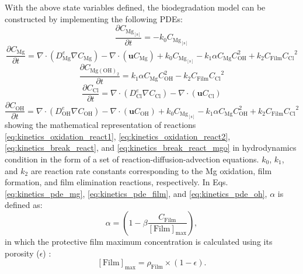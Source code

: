 With the above state variables defined, the biodegradation model can be constructed by implementing the following {PDE}s:
\begin{equation} \label{eq:kinetics_pde_mg_solid}
\frac{\partial C_{\mathrm{Mg}_\mathrm{[s]}}}{\partial t}=-k_{0}C_{\mathrm{Mg}_\mathrm{[s]}}
\end{equation}
\begin{equation} \label{eq:kinetics_pde_mg}
\frac{\partial C_{\mathrm{Mg}}}{\partial t}=\nabla \cdot \left(D_{\mathrm{Mg}}^{e}  \nabla C_{\mathrm{Mg}} \right)-\nabla \cdot \left({\mathbf u} C_{\mathrm{Mg}} \right)+k_{0}C_{\mathrm{Mg}_\mathrm{[s]}}-k_{1}\alpha C_{\mathrm{Mg}}C_{\mathrm{OH}}^2 +k_{2} C_{\mathrm{Film}} {C_{\mathrm{Cl}}}^{2}
\end{equation}
\begin{equation} \label{eq:kinetics_pde_film}
\frac{\partial C_{\mathrm{Mg}(\mathrm{OH})_{2}}}{\partial t}=k_{1}\alpha C_{\mathrm{Mg}}C_{\mathrm{OH}}^2 -k_{2} C_{\mathrm{Film}} {C_{\mathrm{Cl}}}^{2}
\end{equation}
\begin{equation} \label{eq:kinetics_pde_cl}
\frac{\partial C_{\mathrm{Cl}}}{\partial t}=\nabla \cdot \left(D_{\mathrm{Cl}}^{e}  \nabla C_{\mathrm{Cl}} \right)-\nabla \cdot \left({\mathbf u} C_{\mathrm{Cl}} \right)
\end{equation}
\begin{equation} \label{eq:kinetics_pde_oh}
\frac{\partial C_{\mathrm{OH}}}{\partial t}=\nabla \cdot \left(D_{\mathrm{OH}}^{e}  \nabla C_{\mathrm{OH}} \right)-\nabla \cdot \left({\mathbf u} C_{\mathrm{OH}} \right)+k_{0}C_{\mathrm{Mg}_\mathrm{[s]}}-k_{1}\alpha C_{\mathrm{Mg}}C_{\mathrm{OH}}^2 +k_{2} C_{\mathrm{Film}} {C_{\mathrm{Cl}}}^{2}
\end{equation}
showing the mathematical representation of reactions \ref{eq:kinetics_oxidation_react1}, \ref{eq:kinetics_oxidation_react2}, \ref{eq:kinetics_break_react}, and \ref{eq:kinetics_break_react_mgo} in hydrodynamics condition in the form of a set of reaction-diffusion-advection equations. $k_0$, $k_1$, and $k_2$ are reaction rate constants corresponding to the Mg oxidation, film formation, and film elimination reactions, respectively. In Eqs. \ref{eq:kinetics_pde_mg}, \ref{eq:kinetics_pde_film}, and \ref{eq:kinetics_pde_oh}, $\alpha$ is defined as:
\begin{equation} \label{eq:kinetics_film_alpha}
\alpha=\left(1-\beta \frac{C_{\mathrm{Film}}}{[\mathrm{Film}]_{\max }}\right),
\end{equation}
in which the protective film maximum concentration is calculated using its porosity ($\epsilon$) \cite{Bajger2016}:
\begin{equation} \label{eq:kinetics_film_max}
[\mathrm{Film}]_{\max }=\rho_{\mathrm{Film}} \times(1-\epsilon).
\end{equation}

